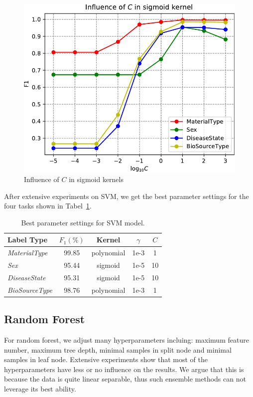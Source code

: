 \documentclass[sigconf]{acmart}
\begin{document}
\begin{figure}[h]
\centering
\includegraphics[width=0.8\linewidth]{../figs/C_sigmoid}
\caption{Influence of $C$ in sigmoid kernels}
\label{fig:C_sigmoid}
\end{figure}


After extensive experiments on SVM, we get the best parameter settings for the four tasks shown in Tabel~\ref{tab:SVM}.


	\begin{table}[tbp]
		\centering
		\begin{tabular}{l|cccc}
			\toprule
			{Label Type} & $F_1 (\%)$ & Kernel &$\gamma$ & $C$ \\
			\midrule
			{\textit{MaterialType}}&99.85 & polynomial &1e-3&1\\
			{\textit{Sex}}		& 95.44 & sigmoid    &1e-5&10 \\
			{\textit{DiseaseState}}& 95.31 & sigmoid &1e-5&10\\
			{\textit{BioSourceType}}& 98.76 & polynomial &1e-3&1\\
			\bottomrule	
		\end{tabular}
		\caption{Best parameter settings for SVM model. }
		\label{tab:SVM}
	\end{table}

	 
	\subsection{Random Forest}
	For random forest, we adjust many hyperparameters incluing: maximum feature number, maximum tree depth, minimal samples in split node and minimal samples in leaf node. Extensive experiments show that most of the hyperparameters have less or no influence on the results. We argue that this is because the data is quite linear separable, thus such ensemble methods can not leverage its best ability. 
	
\end{document}
